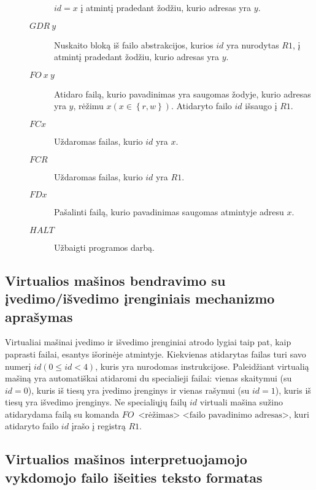 \begin{description}
\begin{description}
          $id = x$ į atmintį pradedant žodžiu, kurio adresas yra $y$.
        \item[$GDR \: y$] Nuskaito bloką iš failo abstrakcijos, kurios
          $id$ yra nurodytas $R1$, į atmintį pradedant žodžiu, kurio 
          adresas yra $y$.
        \item[$FO \: x \: y$] Atidaro failą, kurio pavadinimas yra saugomas
          žodyje, kurio adresas yra $y$, rėžimu 
          $x (x \in \left\{ r, w \right\})$. Atidaryto failo $id$ 
          išsaugo į $R1$.
        \item[$FC x$] Uždaromas failas, kurio $id$ yra $x$.
        \item[$FCR$] Uždaromas failas, kurio $id$ yra $R1$.
        \item[$FD x$] Pašalinti failą, kurio pavadinimas saugomas atmintyje
          adresu $x$.
        \item[$HALT$] Užbaigti programos darbą.
    \end{description}
  \end{description} 
  
\subsection{Virtualios mašinos bendravimo su įvedimo/išvedimo įrenginiais
mechanizmo aprašymas}

Virtualiai mašinai įvedimo ir išvedimo įrenginiai atrodo lygiai taip pat,
kaip paprasti failai, esantys išorinėje atmintyje. Kiekvienas atidarytas
failas turi savo numerį $id (0 \leq id < 4)$, kuris yra nurodomas 
instrukcijose. Paleidžiant virtualią mašiną yra automatiškai atidaromi
du specialieji failai: vienas skaitymui (su $id = 0$), kuris iš tiesų yra
įvedimo įrenginys ir vienas rašymui (su $id = 1$), kuris iš tiesų yra 
išvedimo įrenginys. Ne specialiųjų failų $id$ virtuali mašina sužino
atidarydama failą su komanda 
$FO\,\text{ <rėžimas> <failo pavadinimo adresas>}$,
kuri atidaryto failo $id$ įrašo į registrą $R1$.


\subsection{Virtualios mašinos interpretuojamojo vykdomojo failo išeities 
teksto formatas}

